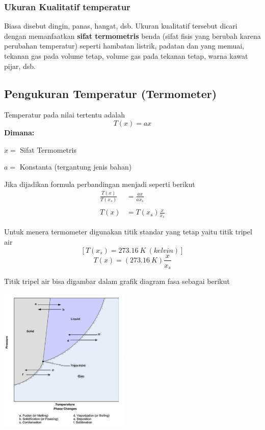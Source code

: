 \documentclass[twocolumn, 11pt]{article}%
\begin{document}
        \subsubsection{Ukuran Kualitatif temperatur}
        Biasa disebut dingin, panas, hangat, dsb. Ukuran kualitatif tersebut dicari dengan memanfaatkan \textbf{sifat termometris} benda (sifat fisis yang berubah karena perubahan temperatur) seperti hambatan listrik, padatan dan yang memuai, tekanan gas pada volume tetap, volume gas pada tekanan tetap, warna kawat pijar, dsb.

    \subsection{Pengukuran Temperatur (Termometer)}
        Temperatur pada nilai tertentu adalah
        \[T(x) = ax \]
        \textbf{Dimana:}

        $x=$ Sifat Termometris
        
        $a=$ Konstanta (tergantung jenis bahan)

        Jika dijadikan formula perbandingan menjadi seperti berikut
            \begin{align*}
                \frac{T(x)}{T(x_s)} &= \frac{ax}{ax_s}\\\\
                T(x) &= T(x_s) \frac{x}{x_s}
            \end{align*}

        Untuk menera termometer digunakan titik standar yang tetap yaitu titik tripel air
        $$[T(x_s) = 273.16\ K\ (kelvin)]$$
        $$ T(x) = (273.16\ K) \frac{x}{x_s}$$

        Titik tripel air bisa digambar dalam grafik diagram fasa sebagai berikut

        \begin{center}
            \includegraphics[width=235px]{2.png}
        \end{center}
\end{document}
